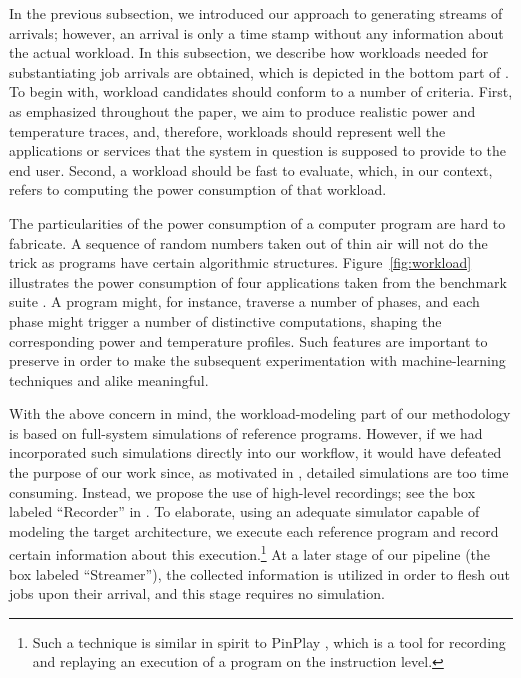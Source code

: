 
In the previous subsection, we introduced our approach to generating streams of
arrivals; however, an arrival is only a time stamp without any information about
the actual workload. In this subsection, we describe how workloads needed for
substantiating job arrivals are obtained, which is depicted in the bottom part
of . To begin with, workload candidates should conform to a
number of criteria. First, as emphasized throughout the paper, we aim to produce
realistic power and temperature traces, and, therefore, workloads should
represent well the applications or services that the system in question is
supposed to provide to the end user. Second, a workload should be fast to
evaluate, which, in our context, refers to computing the power consumption of
that workload.

The particularities of the power consumption of a computer program are hard to
fabricate. A sequence of random numbers taken out of thin air will not do the
trick as programs have certain algorithmic structures.
Figure~\ref{fig:workload} illustrates the power consumption of four applications
taken from the  benchmark suite \cite{cpu2006}. A program
might, for instance, traverse a number of phases, and each phase might trigger a
number of distinctive computations, shaping the corresponding power and
temperature profiles. Such features are important to preserve in order to make
the subsequent experimentation with machine-learning techniques and alike
meaningful.

With the above concern in mind, the workload-modeling part of our methodology is
based on full-system simulations of reference programs. However, if we had
incorporated such simulations directly into our workflow, it would have defeated
the purpose of our work since, as motivated in , detailed
simulations are too time consuming. Instead, we propose the use of high-level
recordings; see the box labeled ``Recorder'' in . To
elaborate, using an adequate simulator capable of modeling the target
architecture, we execute each reference program and record certain information
about this execution.\footnote{Such a technique is similar in spirit to PinPlay
\cite{patil2010}, which is a tool for recording and replaying an execution of a
program on the instruction level.} At a later stage of our pipeline (the box
labeled ``Streamer''), the collected information is utilized in order to flesh
out jobs upon their arrival, and this stage requires no simulation.

